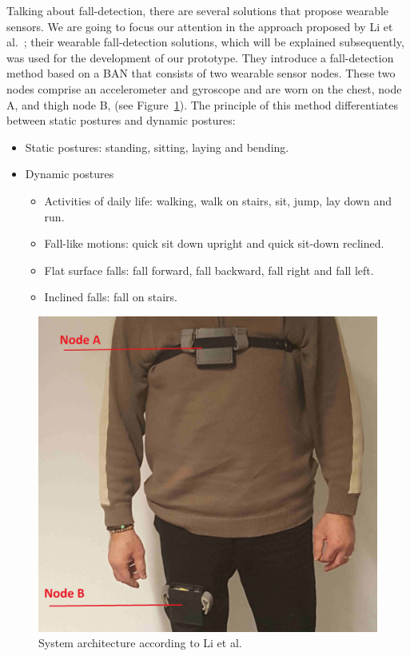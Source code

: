\documentclass[journal]{IEEEtran}
\begin{document}
Talking about fall-detection, there are several solutions that propose wearable sensors.
We are going to focus our attention in the approach proposed by Li et al.~\cite{Li2009}; their wearable fall-detection solutions,
which will be explained subsequently, was used for the development of our prototype. They introduce a fall-detection method based on a BAN that consists 
of two wearable sensor nodes. These two nodes comprise an accelerometer and gyroscope and are worn on the chest, node A, and thigh 
node B, (see Figure~\ref{fig:simulation}). The principle of this method differentiates between static postures and dynamic postures: 

\begin{itemize}
 \item Static postures: standing, sitting, laying and bending.
 \item Dynamic postures
 \begin{itemize}
  \item Activities of daily life: walking, walk on stairs, sit, jump, lay down and run.
  \item Fall-like motions: quick sit down upright and quick sit-down reclined.
  \item Flat surface falls: fall forward, fall backward, fall right and fall left.
  \item Inclined falls: fall on stairs.
 \end{itemize}
\end{itemize}

\begin{figure}[!ht]
  \centering
  \includegraphics[scale=0.15]{img/BasePrototype.png}
  \caption[System architecture]{System architecture according to Li et al.~\cite{Li2009}}
  \label{fig:simulation}
\end{figure}
\end{document}
